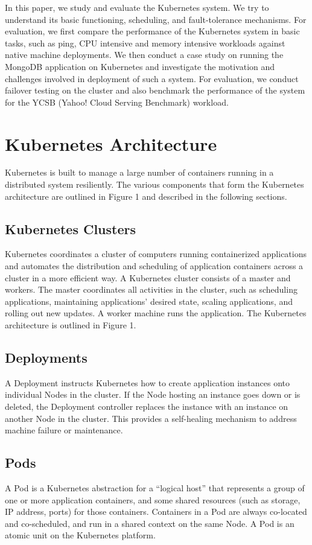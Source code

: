 \documentclass[sigconf]{acmart}
\begin{document}
In this paper, we study and evaluate the Kubernetes system. We try to understand its basic functioning, scheduling, and fault-tolerance mechanisms. For evaluation, we first compare the performance of the Kubernetes system in basic tasks, such as ping, CPU intensive and memory intensive workloads against native machine deployments. We then conduct a case study on running the MongoDB application on Kubernetes and investigate the motivation and challenges involved in deployment of such a system. For evaluation, we conduct failover testing on the cluster and also benchmark the performance of the system for the YCSB (Yahoo! Cloud Serving Benchmark) workload.


\section{Kubernetes Architecture}
Kubernetes is built to manage a large number of containers running in a distributed system resiliently. The various components that form the Kubernetes architecture are outlined in Figure 1 and described in the following sections.

\subsection{Kubernetes Clusters}
Kubernetes coordinates a cluster of computers running containerized applications and automates the distribution and scheduling of application containers across a cluster in a more efficient way. A Kubernetes cluster consists of a master and workers. The master coordinates all activities in the cluster, such as scheduling applications, maintaining applications' desired state, scaling applications, and rolling out new updates. A worker machine runs the application. The Kubernetes architecture is outlined in Figure 1.

\subsection{Deployments}
A Deployment instructs Kubernetes how to create application instances onto individual Nodes in the cluster.  If the Node hosting an instance goes down or is deleted, the Deployment controller replaces the instance with an instance on another Node in the cluster. This provides a self-healing mechanism to address machine failure or maintenance.

\subsection{Pods}
A Pod is a Kubernetes abstraction for a “logical host” that represents a group of one or more application containers, and some shared resources (such as storage, IP address, ports) for those containers. Containers in a Pod are always co-located and co-scheduled, and run in a shared context on the same Node. A Pod is an atomic unit on the Kubernetes platform.
\end{document}
